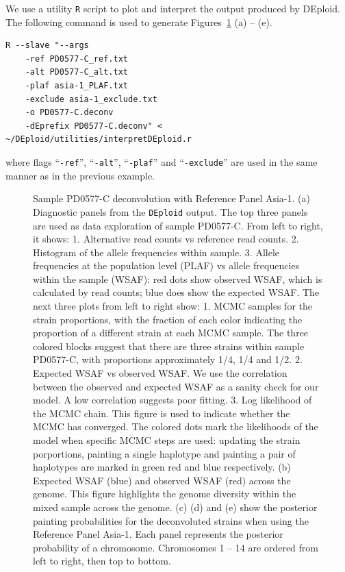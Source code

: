 \documentclass{article}
\begin{document}
We use a utility {\tt R} script to plot and interpret the output produced by DEploid. The following command is used to generate Figures~\ref{fig:PD0577} (a) -- (e).
\linespread{1}
\begin{lstlisting}
R --slave "--args
    -ref PD0577-C_ref.txt
    -alt PD0577-C_alt.txt
    -plaf asia-1_PLAF.txt
    -exclude asia-1_exclude.txt
    -o PD0577-C.deconv
    -dEprefix PD0577-C.deconv" < ~/DEploid/utilities/interpretDEploid.r
\end{lstlisting}
\linespread{1.5}
where flags ``{\tt -ref}'', ``{\tt -alt}'', ``{\tt -plaf}'' and ``{\tt -exclude}'' are used in the same manner as in the previous example.


\begin{figure}[ht]
\centering
\caption{Sample {\textmd PD0577-C} deconvolution with Reference Panel Asia-1. (a) Diagnostic panels from the \texttt{DEploid} output. The top three panels are used as data exploration of sample {\textmd PD0577-C}. From left to right, it shows: 1. Alternative read counts vs reference read counts. 2. Histogram of the allele frequencies within sample.
3. Allele frequencies at the population level (PLAF) vs allele frequencies within the sample (WSAF): red dots show observed WSAF, which is calculated by read counts; blue does show the expected WSAF. The next three plots from left to right show: 1. MCMC samples for the strain proportions, with the fraction of each color indicating the proportion of a different strain at each MCMC sample. The three colored blocks suggest that there are three strains within sample {\textmd PD0577-C}, with proportions approximately 1/4, 1/4 and 1/2.
2. Expected WSAF vs observed WSAF. We use the correlation between the observed and expected WSAF as a sanity check for our model. A low correlation suggests poor fitting.
3. Log likelihood of the MCMC chain. This figure is used to indicate whether the MCMC has converged. The colored dots mark the likelihoods of the model when specific MCMC steps are used: updating the strain porportions, painting a single haplotype and painting a pair of haplotypes are marked in green red and blue respectively. (b) Expected WSAF (blue) and observed WSAF (red) across the genome. This figure highlights the genome diversity within the mixed sample across the genome. (c) (d) and (e) show the posterior painting probabilities for the deconvoluted strains when using the Reference Panel Asia-1. Each panel represents the posterior probability of a chromosome. Chromosomes 1 -- 14 are ordered from left to right, then top to bottom.
}\label{fig:PD0577}
\end{figure}
\end{document}
